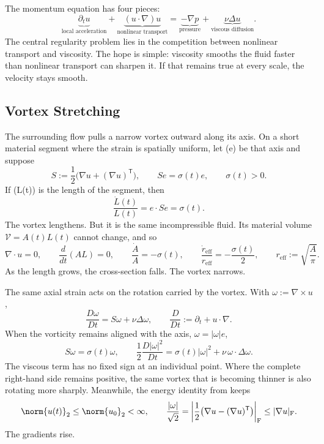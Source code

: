
The momentum equation has four pieces:
\[
  \underbrace{\partial_t u}_{\text{local acceleration}}
  +
  \underbrace{(u\cdot\nabla)u}_{\text{nonlinear transport}}
  =
  \underbrace{-\nabla p}_{\text{pressure}}
  +
  \underbrace{\nu\Delta u}_{\text{viscous diffusion}}.
\]
The central regularity problem lies in the competition between nonlinear transport and viscosity.
The hope is simple: viscosity smooths the fluid faster than nonlinear transport can sharpen it.
If that remains true at every scale, the velocity stays smooth.

\subsection{Vortex Stretching}\label{sub:ThePerfectlyStretchingVortex}

The surrounding flow pulls a narrow vortex outward along its axis.
On a short material segment where the strain is spatially uniform, let (e) be that axis and suppose
\[
  S:=\frac12\bigl(\nabla u+(\nabla u)^{\mathsf T}\bigr),
  \qquad
  Se=\sigma(t)e,
  \qquad
  \sigma(t)>0.
\]
If (L(t)) is the length of the segment, then
\[
  \frac{\dot L(t)}{L(t)}
  =
  e\cdot Se
  =
  \sigma(t).
\]
The vortex lengthens.
But it is the same incompressible fluid.
Its material volume \(\mathcal V=A(t)L(t)\) cannot change, and so
\[
  \nabla\cdot u=0,
  \qquad
  \frac{d}{dt}(A L)=0,
  \qquad
  \frac{\dot A}{A}=-\sigma(t),
  \qquad
  \frac{\dot r_{\mathrm{eff}}}{r_{\mathrm{eff}}}
  =
  -\frac{\sigma(t)}{2},
  \qquad
  r_{\mathrm{eff}}:=\sqrt{\frac{A}{\pi}}.
\]
As the length grows, the cross-section falls.
The vortex narrows.

The same axial strain acts on the rotation carried by the vortex.
With \(\omega:=\nabla\times u\),
\[
  \frac{D\omega}{Dt}
  =
  S\omega+\nu\Delta\omega,
  \qquad
  \frac{D}{Dt}
  :=
  \partial_t+u\cdot\nabla.
\]
When the vorticity remains aligned with the axis, \(\omega=|\omega|e\),
\[
  S\omega
  =
  \sigma(t)\omega,
  \qquad
  \frac12\frac{D|\omega|^2}{Dt}
  =
  \sigma(t)|\omega|^2
  +
  \nu\,\omega\cdot\Delta\omega.
\]
The viscous term has no fixed sign at an individual point.
Where the complete right-hand side remains positive, the same vortex that is becoming thinner is also rotating more sharply.
Meanwhile, the energy identity from  keeps
\[
  \norm{u(t)}_2
  \leq
  \norm{u_0}_2
  <
  \infty,
  \qquad
  \frac{|\omega|}{\sqrt2}
  =
  \left|\frac12\bigl(\nabla u-(\nabla u)^{\mathsf T}\bigr)\right|_{\mathrm F}
  \leq
  |\nabla u|_{\mathrm F}.
\]
The gradients rise.

